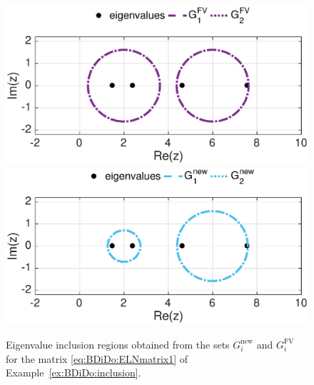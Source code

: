 \begin{example}
{\begin{figure}[h!]
\centering
\vspace*{-0.4cm}
\includegraphics[width=0.49\linewidth]{figures/Example415_a1}
\includegraphics[width=0.49\linewidth]{figures/Example415_a2}
\vspace*{-0.5cm}
\caption{Eigenvalue inclusion regions obtained from the sets
$G_i^{\text{new}}$ and $G_i^{\text{FV}}$ for the matrix \eqref{eq:BDiDo:ELNmatrix1} of Example~\ref{ex:BDiDo:inclusion}.}
\label{fig:BDiDo:ex:inclusion1}
\end{figure}

}
\end{example}
